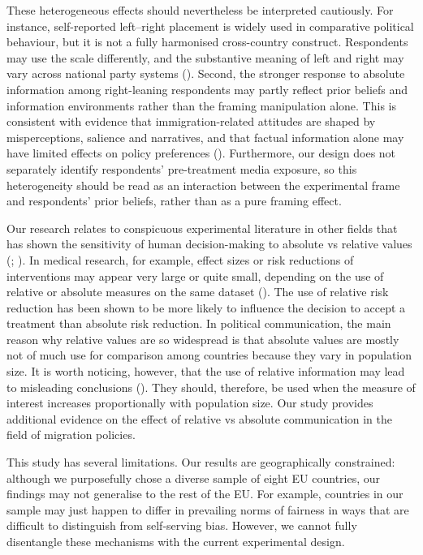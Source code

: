 \documentclass[
  12pt,
  a4paper,
]{article}
\begin{document}
These heterogeneous effects should nevertheless be interpreted cautiously. For instance, self-reported left--right placement is widely used in comparative political behaviour, but it is not a fully harmonised cross-country construct. Respondents may use the scale differently, and the substantive meaning of left and right may vary across national party systems (). Second, the stronger response to absolute information among right-leaning respondents may partly reflect prior beliefs and information environments rather than the framing manipulation alone. This is consistent with evidence that immigration-related attitudes are shaped by misperceptions, salience and narratives, and that factual information alone may have limited effects on policy preferences (). Furthermore, our design does not separately identify respondents' pre-treatment media exposure, so this heterogeneity should be read as an interaction between the experimental frame and respondents' prior beliefs, rather than as a pure framing effect.

Our research relates to conspicuous experimental literature in other fields that has shown the sensitivity of human decision-making to absolute vs relative values (; ). In medical research, for example, effect sizes or risk reductions of interventions may appear very large or quite small, depending on the use of relative or absolute measures on the same dataset (). The use of relative risk reduction has been shown to be more likely to influence the decision to accept a treatment than absolute risk reduction. In political communication, the main reason why relative values are so widespread is that absolute values are mostly not of much use for comparison among countries because they vary in population size. It is worth noticing, however, that the use of relative information may lead to misleading conclusions (). They should, therefore, be used when the measure of interest increases proportionally with population size. Our study provides additional evidence on the effect of relative vs absolute communication in the field of migration policies.

This study has several limitations. Our results are geographically constrained: although we purposefully chose a diverse sample of eight EU countries, our findings may not generalise to the rest of the EU. For example, countries in our sample may just happen to differ in prevailing norms of fairness in ways that are difficult to distinguish from self-serving bias. However, we cannot fully disentangle these mechanisms with the current experimental design.
\end{document}
